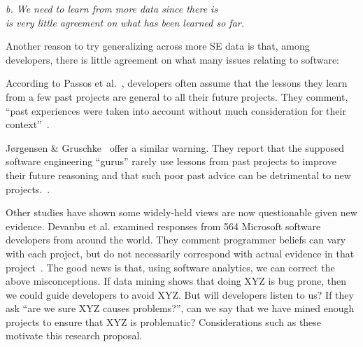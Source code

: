 \begin{center}
{\em b. We need to learn from more data since there is \\
is very little agreement on what has been learned so far.}
\end{center}

Another reason to try generalizing across more SE data is that, among developers, there is little agreement on
what many issues relating to software:
\bi
\item
According to Passos et al.~\cite{passos11},  developers often  assume that 
	the lessons they learn from a few past projects are general to all their 
	future projects. They comment, ``past experiences were taken into account 
	without much consideration for their context''~\cite{passos11}. 
	\item
	J{\o}rgensen \& Gruschke~\cite{Jo09} offer a similar warning. They 
	report that the supposed software engineering ``gurus'' rarely use lessons 
	from past projects to improve their future reasoning and that such poor 
	past advice can be detrimental to new projects.~\cite{Jo09}.
\item
Other 
	studies have shown some widely-held views are   now questionable given new 
	evidence.
	Devanbu et al. examined responses from 564 Microsoft software developers 
	from around
	the world. They comment programmer beliefs can vary with each project, but do not necessarily
	correspond with actual evidence in that project~\cite{De16}. 
	\ei
	The good news is that, using software analytics, we can correct the above misconceptions.
	If data mining shows that   doing  XYZ is      bug prone,
	then we could  guide developers to avoid   XYZ. But will developers listen to us?
	If they ask ``are   we sure  XYZ causes problems?'', can we say that we have mined enough projects
	to ensure that XYZ is problematic? Considerations such as these motivate this research proposal.
	
